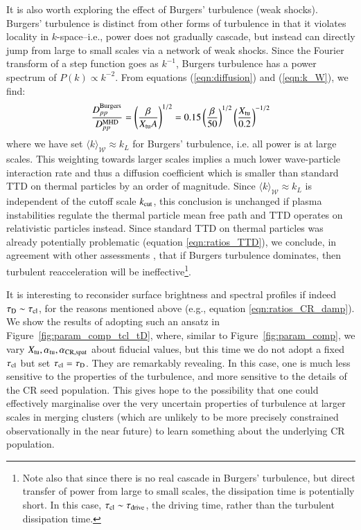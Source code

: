 \documentclass[fleqn,usenatbib,useAMS]{mnras}
\newcommand\cp[1]{{\color{red} #1}}
\begin{document}
It is also worth exploring the effect of Burgers' turbulence (weak shocks). \cp{Burgers' turbulence is distinct from other forms of turbulence in that it violates locality in $k$-space--i.e., power does not gradually cascade, but instead can directly jump from large to small scales via a network of weak shocks. Since the Fourier transform of a step function goes as $k^{-1}$, Burgers turbulence has a power spectrum of $P(k) \propto k^{-2}$.} From equations (\ref{eqn:diffusion}) and (\ref{eqn:k_W}), we find: 
\begin{equation}
\frac{D_{pp}^{\rm Burgers}}{D_{pp}^{\rm MHD}} = \left( \frac{\beta}{X_{\rm tu} A} \right)^{1/2} = 0.15 \left( \frac{\beta}{50} \right)^{1/2} \left( \frac{X_{\rm tu}}{0.2} \right)^{-1/2} 
\end{equation}
where we have set $\langle k \rangle_{\mathcal{W}} \approx k_L$ for Burgers' turbulence, i.e. all power is at large scales. This weighting towards larger scales implies a much lower wave-particle interaction rate and thus a diffusion coefficient which is smaller than standard TTD on thermal particles by an order of magnitude. Since $\langle k \rangle_{\mathcal{W}} \approx k_L$ is independent of the cutoff scale $k_{\rm cut}$, this conclusion is unchanged if plasma instabilities regulate the thermal particle mean free path and TTD operates on relativistic particles instead. Since standard TTD on thermal particles was already potentially problematic (equation \ref{eqn:ratios_TTD}), we conclude, in agreement with other assessments \citep{miniati15,brunetti16_review}, that if Burgers turbulence dominates, then turbulent reacceleration will be ineffective\footnote{Note also that since there is no real cascade in Burgers' turbulence, but direct transfer of power from large to small scales, the dissipation time is potentially short. In this case, $\tau_{\rm cl} \sim \tau_{\rm drive}$, the driving time, rather than the turbulent dissipation time.}.

It is interesting to reconsider surface brightness and spectral profiles if indeed $\tau_{\rm D} \sim \tau_{\rm cl}$, for the reasons mentioned above (e.g., equation \ref{eqn:ratios_CR_damp}). We show the results of adopting such an ansatz in Figure~\ref{fig:param_comp_tcl_tD}, where, similar to Figure~\ref{fig:param_comp}, we vary $X_{\rm tu}, \alpha_{\rm tu}, \alpha_{\rm CR, spat}$ about fiducial values, but this time we do not adopt a fixed $\tau_{\rm cl}$ but set $\tau_{\rm cl}=\tau_{\rm D}$.  They are remarkably revealing. In this case, one is much less sensitive to the properties of the turbulence, and more sensitive to the details of the CR seed population. This gives hope to the possibility that one could effectively marginalise over the very uncertain properties of turbulence at larger scales in merging clusters (which are unlikely to be more precisely constrained observationally in the near future) to learn something about the underlying CR population. 
\end{document}
